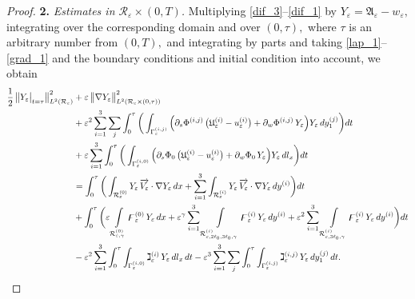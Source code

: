 \documentclass[reqno]{amsart}            %
\numberwithin{equation}{section}
\begin{document}
\begin{proof}
		\textbf{2.} \emph{Estimates in $\mathcal{R}_\varepsilon\times (0,T)$.} 
		Multiplying \eqref{dif_3}--\eqref{dif_1} by  $Y_\varepsilon = \mathfrak{A}_\varepsilon - w_\varepsilon,$  integrating over the corresponding domain and over $ (0, \tau),$ where $\tau$ is an arbitrary number from $(0, T),$ and integrating by parts and taking \eqref{lap_1}--\eqref{grad_1} and the boundary conditions and initial condition into account, we obtain
		\begin{align}\label{th-6}
			\frac{1}{2}\, \big\|Y_\varepsilon\big|_{t=\tau}\big\|^2_{L^2(\mathcal{R}_\varepsilon)}
			& + \varepsilon \, \big\| {\nabla Y_\varepsilon}\big\|^2_{L^2(\mathcal{R}_\varepsilon\times (0, \tau))} \notag
			\\
			&+ 
			\varepsilon^2 \sum_{i=1}^{3} \sum_j\int_{0}^{\tau}\bigg(\int_{\Gamma^{(i,j)}_\varepsilon}
			\Big(\partial_s\Phi^{(i,j)}\, \big(\mathfrak{U}^{(i)}_\varepsilon - u^{(i)}_\varepsilon\big) + \partial_w\Phi^{(i,j)}\, Y_\varepsilon  \Big) Y_\varepsilon \, d y_1^{(j)}\bigg)dt \notag
			\\
			&+ \varepsilon \sum_{i=1}^{3}\int_{0}^{\tau}\bigg(\int_{\Gamma^{(i,0)}_\varepsilon}\Big(
			\partial_s\Phi_0\, \big(\mathfrak{U}^{(i)}_\varepsilon - u^{(i)}_\varepsilon\big) + \partial_w\Phi_0\, Y_\varepsilon\Big) Y_\varepsilon \, dl_x\bigg)dt \notag
			\\
			& = 
			\int_{0}^{\tau} \bigg(\int_{\mathcal{R}^{(0)}_\varepsilon} Y_\varepsilon\,
			\overrightarrow{V_\varepsilon} \cdot
			{\nabla Y_\varepsilon} \, dx + \sum_{i=1}^{3}\int_{\mathcal{R}^{(i)}_\varepsilon} Y_\varepsilon\,
			\overrightarrow{V_\varepsilon} \cdot
			{\nabla Y_\varepsilon} \, dy^{(i)}\bigg) dt \notag
			\\
			& +
			\int_{0}^{\tau}\bigg(
			\varepsilon \int\limits_{\mathcal{R}_{\varepsilon, \gamma}^{(0)}}  \digamma^{(0)}_\varepsilon \, Y_\varepsilon \, dx
			+ \varepsilon^{{\gamma}} \sum_{i=1}^{3} \int\limits_{\mathcal{R}^{(i)}_{\varepsilon,2\ell_0,3\ell_0,\gamma}}
			\digamma^{(i)}_\varepsilon \, Y_\varepsilon \, dy^{(i)} + \varepsilon^2 \sum_{i=1}^{3} \int\limits_{\mathcal{R}^{(i)}_{\varepsilon,3\ell_0,\gamma}}  \digamma^{(i)}_\varepsilon \, Y_\varepsilon \, dy^{(i)}\bigg)dt \notag
			\\
			& - \varepsilon^2 \sum_{i=1}^{3}\int_{0}^{\tau} \int_{\Gamma^{(i,0)}_\varepsilon}\gimel^{(i)}_\varepsilon \,  Y_\varepsilon \, dl_x\, dt
			- \varepsilon^3 \sum_{i=1}^{3} \sum_j\int_{0}^{\tau} \int_{\Gamma^{(i,j)}_\varepsilon}
			\gimel^{(i,j)}_\varepsilon \,  Y_\varepsilon \, d y_1^{(j)} \, dt .
		\end{align}

\end{proof}
\end{document}
